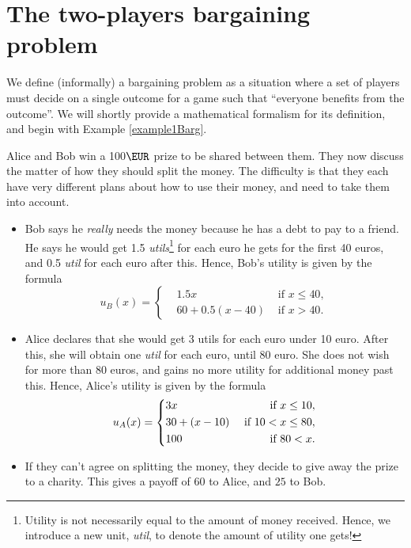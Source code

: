 \section{The two-players bargaining problem}
\label{sec2PBarg}


We define (informally) a bargaining problem as a situation where a set of players must decide on a single outcome for a game such that ``everyone benefits from the outcome''. We will shortly provide a mathematical formalism for its definition, and begin with Example \ref{example1Barg}.

\begin{example}
\label{example1Barg}
Alice and Bob win a 100$\EUR$ prize to be shared between them.
They now discuss the matter of how they should split the money. The difficulty is that they each have very different plans about how to use their money, and need to take them into account.
\begin{itemize}
\item Bob says he \emph{really} needs the money because he has a debt to pay to a friend.
He says he would get 1.5 \emph{utils}\footnote{Utility is not necessarily equal to the amount of money received. Hence, we introduce a new unit, \emph{util}, to denote the amount of utility one gets!} for each euro he gets for the first 40 euros, and 0.5 \emph{util} for each euro after this.
Hence, Bob's utility is given by the formula
$$u_B(x) = \left \{ \begin{aligned}
& 1.5x & \text{ if $x \leq 40$}, \\
& 60 + 0.5(x - 40) & \text{ if $x > 40$}.
\end{aligned} \right . $$
\item Alice declares that she would get 3 utils for each euro under 10 euro.
After this, she will obtain one \emph{util} for each euro, until 80 euro. She does not wish for more than 80 euros, and gains no more utility for additional money past this.
Hence, Alice's utility is given by the formula
$$u_A(x) = \left \{ \begin{aligned}
& 3x & \text{ if $x \leq 10$}, \\
& 30 + (x - 10) & \text{ if $ 10 < x \leq 80$}, \\
& 100  & \text{ if $80 < x $}.
\end{aligned} \right . $$
\item If they can't agree on splitting the money, they decide to give away the prize to a charity. This gives a payoff of $60$ to Alice, and $25$ to Bob.
\end{itemize}

\end{example}
